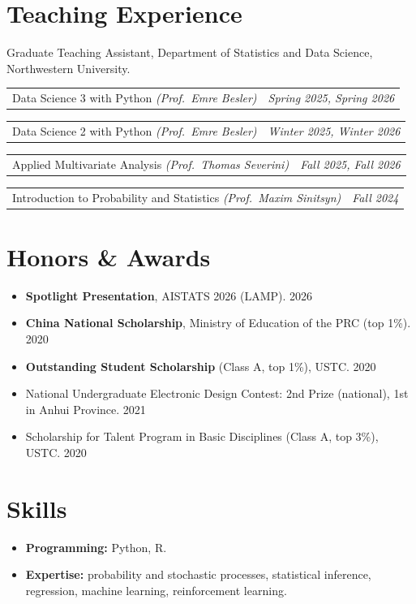 \documentclass[10.5pt]{article}
\makeatletter
\newcommand{\entryline}[2]{%
  \par\noindent
  \begin{tabularx}{\textwidth}{@{}X@{}r@{}}
    #1 & {\itshape\color{metagray}#2} \\
  \end{tabularx}\par\vspace{1.5pt}}
\newenvironment{bullets}
  {\begin{itemize}[leftmargin=1.35em, topsep=2pt, itemsep=1.5pt, parsep=0pt,
                   label=\textcolor{accent}{\footnotesize$\bullet$}]\small}
  {\end{itemize}}
\makeatother
\begin{document}
\section{Teaching Experience}
Graduate Teaching Assistant, Department of Statistics and Data Science, Northwestern University.
\vspace{3pt}
\entryline{\makebox[6em][l]{STAT 303-3}Data Science 3 with Python \; {\small\itshape\color{metagray}(Prof.\ Emre Besler)}}{Spring 2025, Spring 2026}
\entryline{\makebox[6em][l]{STAT 303-2}Data Science 2 with Python \; {\small\itshape\color{metagray}(Prof.\ Emre Besler)}}{Winter 2025, Winter 2026}
\entryline{\makebox[6em][l]{STAT 348}Applied Multivariate Analysis \; {\small\itshape\color{metagray}(Prof.\ Thomas Severini)}}{Fall 2025, Fall 2026}
\entryline{\makebox[6em][l]{STAT 210}Introduction to Probability and Statistics \; {\small\itshape\color{metagray}(Prof.\ Maxim Sinitsyn)}}{Fall 2024}

\section{Honors \& Awards}
\begin{bullets}
  \item \textbf{Spotlight Presentation}, AISTATS 2026 (LAMP). \hfill 2026
  \item \textbf{China National Scholarship}, Ministry of Education of the PRC (top 1\%). \hfill 2020
  \item \textbf{Outstanding Student Scholarship} (Class A, top 1\%), USTC. \hfill 2020
  \item National Undergraduate Electronic Design Contest: 2nd Prize (national), 1st in Anhui Province. \hfill 2021
  \item Scholarship for Talent Program in Basic Disciplines (Class A, top 3\%), USTC. \hfill 2020
\end{bullets}

\section{Skills}
\begin{bullets}
  \item \textbf{Programming:} Python, R.
  \item \textbf{Expertise:} probability and stochastic processes, statistical inference, regression, machine learning,
        reinforcement learning.
\end{bullets}
\end{document}
